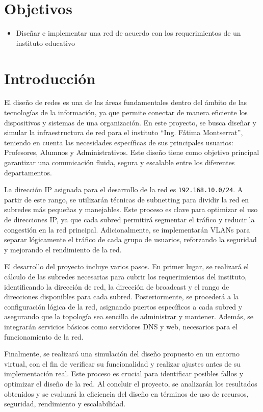 \setcounter{page}{1}

\section{Objetivos}
    \begin{itemize}
        \item Diseñar e implementar una red de acuerdo con los requerimientos de un instituto educativo
    \end{itemize}

\section{Introducción}

El diseño de redes es una de las áreas fundamentales dentro del ámbito de las tecnologías de la información, ya que permite conectar de manera eficiente los dispositivos y sistemas de una organización. En este proyecto, se busca diseñar y simular la infraestructura de red para el instituto “Ing. Fátima Montserrat”, teniendo en cuenta las necesidades específicas de sus principales usuarios: Profesores, Alumnos y Administrativos. Este diseño tiene como objetivo principal garantizar una comunicación fluida, segura y escalable entre los diferentes departamentos.

La dirección IP asignada para el desarrollo de la red es \texttt{192.168.10.0/24}. A partir de este rango, se utilizarán técnicas de subnetting para dividir la red en subredes más pequeñas y manejables. Este proceso es clave para optimizar el uso de direcciones IP, ya que cada subred permitirá segmentar el tráfico y reducir la congestión en la red principal. Adicionalmente, se implementarán VLANs para separar lógicamente el tráfico de cada grupo de usuarios, reforzando la seguridad y mejorando el rendimiento de la red.

El desarrollo del proyecto incluye varios pasos. En primer lugar, se realizará el cálculo de las subredes necesarias para cubrir los requerimientos del instituto, identificando la dirección de red, la dirección de broadcast y el rango de direcciones disponibles para cada subred. Posteriormente, se procederá a la configuración lógica de la red, asignando puertos específicos a cada subred y asegurando que la topología sea sencilla de administrar y mantener. Además, se integrarán servicios básicos como servidores DNS y web, necesarios para el funcionamiento de la red.

Finalmente, se realizará una simulación del diseño propuesto en un entorno virtual, con el fin de verificar su funcionalidad y realizar ajustes antes de su implementación real. Este proceso es crucial para identificar posibles fallos y optimizar el diseño de la red. Al concluir el proyecto, se analizarán los resultados obtenidos y se evaluará la eficiencia del diseño en términos de uso de recursos, seguridad, rendimiento y escalabilidad.


